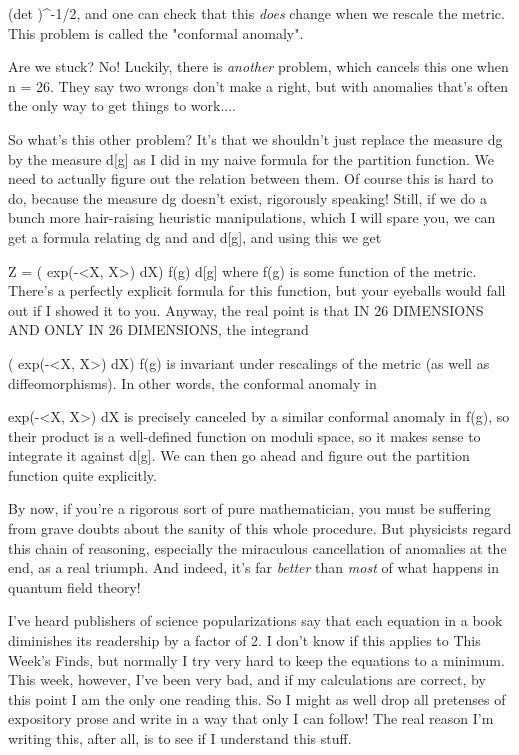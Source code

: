                   (det \Delta )^{-1/2},
and one can check that this \emph{does} change when we rescale the metric. 
This problem is called the "conformal anomaly".  

Are we stuck?  No!  Luckily, there is \emph{another} problem, which cancels
this one when n = 26.   They say two wrongs don't make a right, but 
with anomalies that's often the only way to get things to work....

So what's this other problem?  It's that we shouldn't just replace the
measure dg by the measure d[g] as I did in my naive formula for the
partition function.  We need to actually figure out the relation between
them.  Of course this is hard to do, because the measure dg doesn't
exist, rigorously speaking!  Still, if we do a bunch more hair-raising
heuristic manipulations, which I will spare you, we can get a formula
relating dg and and d[g], and using this we get
 
      Z = \int  ( \int  exp(-<X, \Delta X>) dX) f(g) d[g]   
where f(g) is some function of the metric.  There's a perfectly explicit
formula for this function, but your eyeballs would fall out if I showed
it to you.  Anyway, the real point is that IN 26 DIMENSIONS AND ONLY IN 26
DIMENSIONS, the integrand

               ( \int  exp(-<X, \Delta X>) dX) f(g) 
is invariant under rescalings of the metric (as well as diffeomorphisms).
In other words, the conformal anomaly in

                 \int  exp(-<X, \Delta X>) dX
is precisely canceled by a similar conformal anomaly in f(g), so their
product is a well-defined function on moduli space, so it makes sense
to integrate it against d[g].  We can then go ahead and figure out the
partition function quite explicitly.

By now, if you're a rigorous sort of pure mathematician, you must be
suffering from grave doubts about the sanity of this whole procedure.
But physicists regard this chain of reasoning, especially the miraculous
cancellation of anomalies at the end, as a real triumph.  And indeed,
it's far \emph{better} than \emph{most} 
of what happens in quantum field theory!

I've heard publishers of science popularizations say that each equation
in a book diminishes its readership by a factor of 2.  I don't know if
this applies to This Week's Finds, but normally I try very hard to keep
the equations to a minimum.  This week, however, I've been very bad, and
if my calculations are correct, by this point I am the only one reading
this.  So I might as well drop all pretenses of expository prose and
write in a way that only I can follow!  The real reason I'm writing
this, after all, is to see if I understand this stuff.

